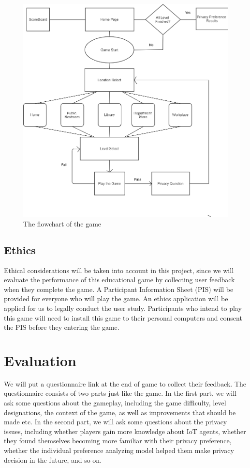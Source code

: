 \documentclass[a4paper,11pt]{article}
\begin{document}
\begin{figure}
    \centering
    \includegraphics[scale=0.33]{Diagram.png}
    \caption{The flowchart of the game}
    \label{fig:my_label}
\end{figure}


\subsection{Ethics}

Ethical considerations will be taken into account in this project, since we will evaluate the performance of this educational game by collecting user feedback when they complete the game. A Participant Information Sheet (PIS) will be provided for everyone who will play the game. An ethics application will be applied for us to legally conduct the user study. Participants who intend to play this game will need to install this game to their personal computers and consent the PIS before they entering the game.



\section{Evaluation}

We will put a questionnaire link at the end of game to collect their feedback. The questionnaire consists of two parts just like the game. In the first part, we will ask some questions about the gameplay, including the game difficulty, level designations, the context of the game, as well as improvements that should be made etc. In the second part, we will ask some questions about the privacy issues, including whether players gain more knowledge about IoT agents, whether they found themselves becoming more familiar with their privacy preference, whether the individual preference analyzing model helped them make privacy decision in the future, and so on.
\end{document}
